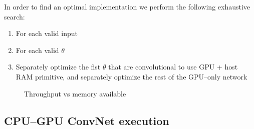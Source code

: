 \documentclass[conference]{./IEEEtran/IEEEtran}
\begin{document}
  In order to find an optimal implementation we perform the following
  exhaustive search:

  \begin{enumerate}
    \item For each valid input
    \item For each valid $\theta$
    \item Separately optimize the fist $\theta$ that are convolutional
      to use GPU + host RAM primitive, and separately optimize the
      rest of the GPU--only network
  \end{enumerate}

  \begin{figure}[!htbp]
    \centering

    \caption{Throughput vs memory available
    }
    \label{fig:final_results}
  \end{figure}

\subsection{CPU--GPU ConvNet execution}
\end{document}
